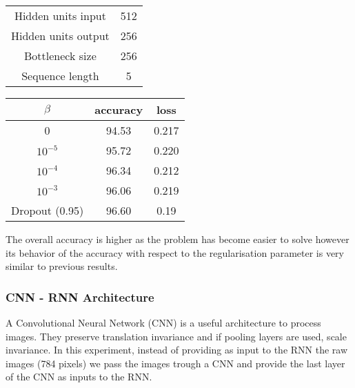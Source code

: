 \documentclass[11pt,oneside,openright]{report}
\begin{document}
\begin{minipage}{0.5\textwidth}
        \centering
\begin{tabular}{ c | c  }
 Hidden units input & 512 \\
 Hidden units output & 256 \\
 Bottleneck size & 256 \\
 Sequence length & 5 \\
\end{tabular}
    \end{minipage}\hfill
    \begin{minipage}{0.5\textwidth}
        \centering
\begin{tabular}{ c | c c }
 $\beta$ & accuracy & loss \\
 \hline
0  & 94.53 & 0.217 \\
$10^{-5}$  & 95.72 & 0.220 \\
$10^{-4}$  & 96.34 & 0.212 \\
$10^{-3}$  & 96.06 & 0.219 \\
\hline
\hline
Dropout (0.95) & 96.60 & 0.19
\end{tabular}
    \end{minipage}

\begin{center}
\end{center}

The overall accuracy is higher as the problem has become easier to solve however its behavior of the accuracy with respect to the regularisation parameter is very similar to previous results.

\subsubsection{CNN - RNN Architecture}
A Convolutional Neural Network (CNN) is a useful architecture to process images. They preserve translation invariance and if pooling layers are used, scale invariance. In this experiment, instead of providing as input to the RNN the raw images (784 pixels) we pass the images trough a CNN and provide the last layer of the CNN as inputs to the RNN.
\end{document}
